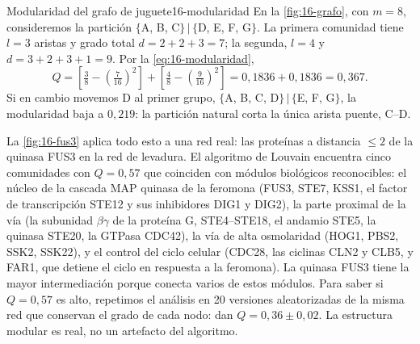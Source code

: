\begin{ejemplo}{Modularidad del grafo de juguete}{16-modularidad}
En la \cref{fig:16-grafo}, con $m=8$, consideremos la partición $\{$A, B, C$\}\,|\,\{$D, E, F, G$\}$. La primera comunidad tiene $l=3$ aristas y grado total $d=2+2+3=7$; la segunda, $l=4$ y $d=3+2+3+1=9$. Por la \cref{eq:16-modularidad},
\[
Q=\left[\tfrac38-\left(\tfrac{7}{16}\right)^2\right]+\left[\tfrac48-\left(\tfrac{9}{16}\right)^2\right]=0{,}1836+0{,}1836=0{,}367.
\]
Si en cambio movemos D al primer grupo, $\{$A, B, C, D$\}\,|\,\{$E, F, G$\}$, la modularidad baja a $0{,}219$: la partición natural corta la única arista puente, C--D.
\end{ejemplo}

La \cref{fig:16-fus3} aplica todo esto a una red real: las proteínas a distancia $\le2$ de la quinasa FUS3 en la red de levadura. El algoritmo de Louvain encuentra cinco comunidades con $Q=0{,}57$ que coinciden con módulos biológicos reconocibles: el núcleo de la cascada MAP quinasa de la feromona (FUS3, STE7, KSS1, el factor de transcripción STE12 y sus inhibidores DIG1 y DIG2), la parte proximal de la vía (la subunidad $\beta\gamma$ de la proteína G, STE4--STE18, el andamio STE5, la quinasa STE20, la GTPasa CDC42), la vía de alta osmolaridad (HOG1, PBS2, SSK2, SSK22), y el control del ciclo celular (CDC28, las ciclinas CLN2 y CLB5, y FAR1, que detiene el ciclo en respuesta a la feromona). La quinasa FUS3 tiene la mayor intermediación porque conecta varios de estos módulos. Para saber si $Q=0{,}57$ es alto, repetimos el análisis en 20 versiones aleatorizadas de la misma red que conservan el grado de cada nodo: dan $Q=0{,}36\pm0{,}02$. La estructura modular es real, no un artefacto del algoritmo.

